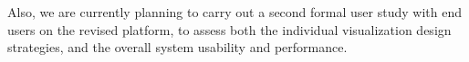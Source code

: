 Also, we are currently planning to carry out a second formal user study with end users on the revised platform, to assess both the individual visualization design strategies, and the overall system usability and performance.


